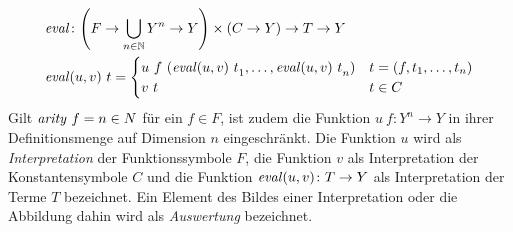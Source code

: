 \begin{equation*}
    \begin{split}
	\Const{eval} &\colon \paren*{F \rightarrow \bigcup_{n \in \mathbb{N}} Y^n \rightarrow Y} \times (C \rightarrow Y) \rightarrow T \rightarrow Y\\
	\Const{eval} &(u, v)~t = \begin{cases}
		u~f~(\elems {\Const{eval}(u, v)~t} 1 n) & t = (f, \tOneN)\\
		v~t                                      & t \in C\\
		\end{cases}
    \end{split}
\end{equation*}
Gilt $\mathit{arity}~f = n \in N$ für ein $f \in F$, ist zudem die Funktion $u~f \colon Y^n \rightarrow Y$ in ihrer Definitionsmenge auf Dimension $n$ eingeschränkt. 
Die Funktion $u$ wird als \emph{\Gls{Interpretation}} der Funktionssymbole $F$, die Funktion $v$ als Interpretation der Konstantensymbole $C$ und die Funktion $\mathit{eval}(u, v) \colon T \rightarrow Y$ als Interpretation der Terme $T$ bezeichnet. 
Ein Element des Bildes einer Interpretation oder die Abbildung dahin wird als \emph{\Gls{Auswertung}} bezeichnet.
\\~\\

